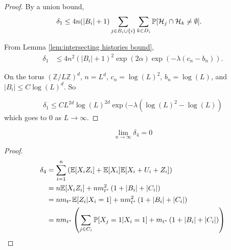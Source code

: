 \begin{proof}
	By a union bound,
	\begin{align}
		\delta_1 &\leq 4 n (|B_i| + 1) \sum_{j \in B_i \cup \{i\}} \sum_{k \in D_i} \mathbb{P}[\mathcal{H}_{j} \cap \mathcal{H}_k \neq \emptyset].
	\end{align}

	From Lemma \ref{lem:intersecting histories bound},
	\begin{align}
		\delta_1 &\leq 4 n^2 (|B_i| + 1)^2 \exp(2\alpha) \exp(-\lambda(c_n - b_n)).
	\end{align}

	On the torus $(\mathbb{Z} / L \mathbb{Z})^d$, $n = L^d$, $c_n = \log(L)^2$, $b_n = \log(L)$, and $|B_i| \leq C \log(L)^d$. So

	\begin{equation}
		\delta_1 \leq C L^{2d} \log(L)^{2d} \exp(-\lambda(\log(L)^2 - \log(L))
	\end{equation}
	which goes to $0$ as $L \rightarrow \infty$.
\end{proof}

\begin{lemma}
\label{lem:delta4 goes to 0 general}
	\begin{equation}
		\lim_{n\rightarrow\infty} \delta_4 = 0
	\end{equation}
\end{lemma}
\begin{proof}
	\begin{align}
		\delta_4 &= \sum_{i = 1}^n \left(\expect[X_i Z_i] + \expect[X_i]\expect[X_i + U_i + Z_i]\right)\\
			&= n \expect[X_i Z_i] + n m_{t^*}^2 \left(1 + |B_i| + |C_i|\right)\\
			&= n m_{t^*} \expect[Z_i | X_i = 1] + n m_{t^*}^2 \left(1 + |B_i| + |C_i|\right)\\
			&= n m_{t^*} \left(\sum_{j \in C_i} \prob[X_j = 1 | X_i = 1] + m_{t^*} \left(1 + |B_i| + |C_i|\right) \right)%
	\end{align}

\end{proof}


